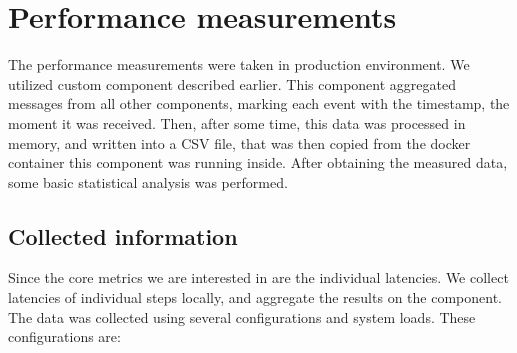 \section{Performance measurements}
The performance measurements were taken in production environment. We utilized custom component described earlier. This component aggregated
messages from all other components, marking each event with the timestamp, the moment it was received. Then, after some time, this
data was processed in memory, and written into a CSV file, that was then copied from the docker container this component was
running inside. After obtaining the measured data, some basic statistical analysis was performed.

\subsection{Collected information}
Since the core metrics we are interested in are the individual latencies. We collect latencies of individual steps locally, and
aggregate the results on the  component. The data was collected using several configurations and system loads.
These configurations are:

